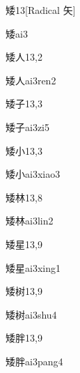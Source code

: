 \begin{entry}{矮}{13}[Radical 矢]
  \begin{phonetics}{矮}{ai3}
  \end{phonetics}
\end{entry}

\begin{entry}{矮人}{13,2}
  \begin{phonetics}{矮人}{ai3ren2}
  \end{phonetics}
\end{entry}

\begin{entry}{矮子}{13,3}
  \begin{phonetics}{矮子}{ai3zi5}
  \end{phonetics}
\end{entry}

\begin{entry}{矮小}{13,3}
  \begin{phonetics}{矮小}{ai3xiao3}
  \end{phonetics}
\end{entry}

\begin{entry}{矮林}{13,8}
  \begin{phonetics}{矮林}{ai3lin2}
  \end{phonetics}
\end{entry}

\begin{entry}{矮星}{13,9}
  \begin{phonetics}{矮星}{ai3xing1}
  \end{phonetics}
\end{entry}

\begin{entry}{矮树}{13,9}
  \begin{phonetics}{矮树}{ai3shu4}
  \end{phonetics}
\end{entry}

\begin{entry}{矮胖}{13,9}
  \begin{phonetics}{矮胖}{ai3pang4}
  \end{phonetics}
\end{entry}

